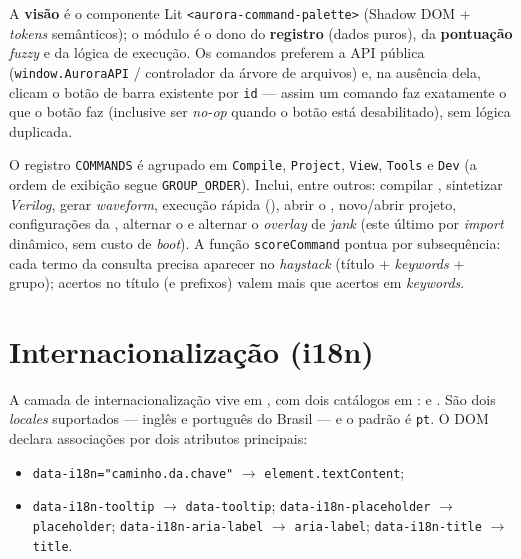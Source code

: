 A \textbf{visão} é o componente Lit \lstinline|<aurora-command-palette>| (Shadow
DOM + \textit{tokens} semânticos); o módulo é o dono do \textbf{registro}
(dados puros), da \textbf{pontuação} \textit{fuzzy} e da lógica de execução. Os
comandos preferem a API pública (\lstinline|window.AuroraAPI| / controlador da
árvore de arquivos) e, na ausência dela, clicam o botão de barra existente por
\lstinline|id| — assim um comando faz exatamente o que o botão faz (inclusive
ser \textit{no-op} quando o botão está desabilitado), sem lógica duplicada.

O registro \lstinline|COMMANDS| é agrupado em \lstinline|Compile|,
\lstinline|Project|, \lstinline|View|, \lstinline|Tools| e \lstinline|Dev| (a
ordem de exibição segue \lstinline|GROUP_ORDER|). Inclui, entre outros:
compilar \cmm, sintetizar \textit{Verilog}, gerar \textit{waveform}, execução
rápida (), abrir o , novo/abrir projeto,
configurações da , alternar o  e alternar o
\textit{overlay} de \textit{jank} (este último por \textit{import} dinâmico, sem
custo de \textit{boot}). A função \lstinline|scoreCommand| pontua por
subsequência: cada termo da consulta precisa aparecer no \textit{haystack}
(título + \textit{keywords} + grupo); acertos no título (e prefixos) valem mais
que acertos em \textit{keywords}.

\section{Internacionalização (i18n)}
\label{sec:13-i18n}

A camada de internacionalização vive em , com dois
catálogos em :  e . São dois
\textit{locales} suportados — inglês e português do Brasil — e o padrão é
\lstinline|pt|. O DOM declara associações por dois atributos principais:

\begin{itemize}[leftmargin=*]
  \item \lstinline|data-i18n="caminho.da.chave"| $\rightarrow$
        \lstinline|element.textContent|;
  \item \lstinline|data-i18n-tooltip| $\rightarrow$ \lstinline|data-tooltip|;
        \lstinline|data-i18n-placeholder| $\rightarrow$ \lstinline|placeholder|;
        \lstinline|data-i18n-aria-label| $\rightarrow$ \lstinline|aria-label|;
        \lstinline|data-i18n-title| $\rightarrow$ \lstinline|title|.
\end{itemize}

